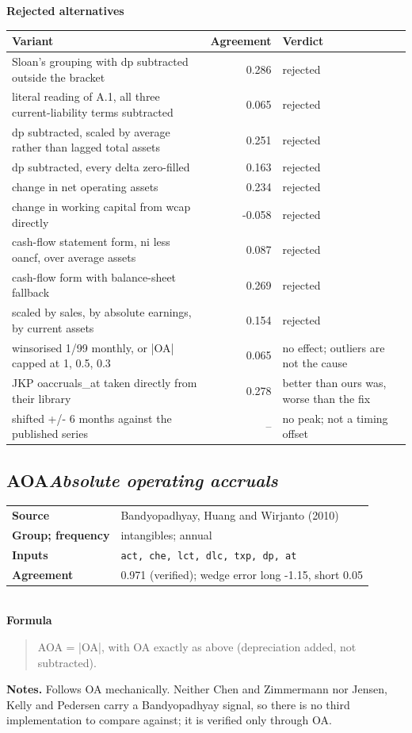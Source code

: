 \documentclass[11pt]{article}
\begin{document}
\textbf{Rejected alternatives}\\[2pt]
{\small\begin{longtable}{@{}p{9.6cm}rp{4.3cm}@{}}
\toprule Variant & Agreement & Verdict\\\midrule\endhead
Sloan's grouping with dp subtracted outside the bracket & 0.286 & rejected\\
literal reading of A.1, all three current-liability terms subtracted & 0.065 & rejected\\
dp subtracted, scaled by average rather than lagged total assets & 0.251 & rejected\\
dp subtracted, every delta zero-filled & 0.163 & rejected\\
change in net operating assets & 0.234 & rejected\\
change in working capital from wcap directly & -0.058 & rejected\\
cash-flow statement form, ni less oancf, over average assets & 0.087 & rejected\\
cash-flow form with balance-sheet fallback & 0.269 & rejected\\
scaled by sales, by absolute earnings, by current assets & 0.154 & rejected\\
winsorised 1/99 monthly, or |OA| capped at 1, 0.5, 0.3 & 0.065 & no effect; outliers are not the cause\\
JKP oaccruals\_at taken directly from their library & 0.278 & better than ours was, worse than the fix\\
shifted +/- 6 months against the published series & -- & no peak; not a timing offset\\
\bottomrule\end{longtable}}
\subsection*{AOA\quad\normalfont\itshape Absolute operating accruals}
\begin{tabular}{@{}p{3.3cm}p{12.3cm}@{}}
\textbf{Source} & Bandyopadhyay, Huang and Wirjanto (2010)\\
\textbf{Group; frequency} & intangibles; annual\\
\textbf{Inputs} & \texttt{act, che, lct, dlc, txp, dp, at}\\
\textbf{Agreement} & 0.971 (verified); wedge error long -1.15, short 0.05\\
\end{tabular}\\[4pt]
\textbf{Formula}
\begin{quote}\small
AOA = |OA|, with OA exactly as above (depreciation added, not subtracted).\\

\end{quote}
\textbf{Notes.} Follows OA mechanically. Neither Chen and Zimmermann nor Jensen, Kelly and Pedersen carry a Bandyopadhyay signal, so there is no third implementation to compare against; it is verified only through OA.
\end{document}
